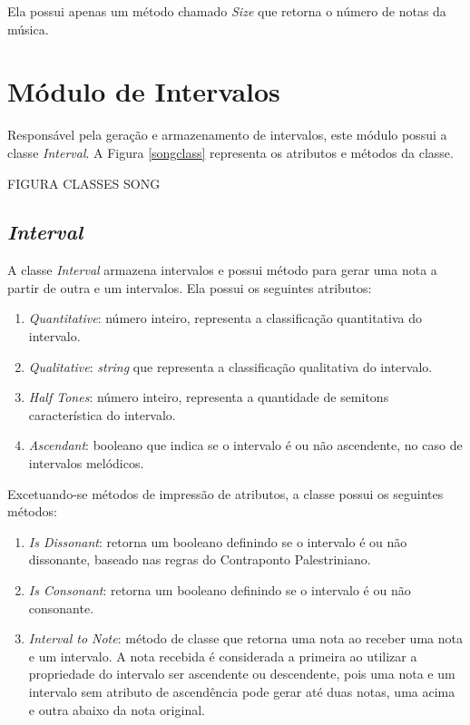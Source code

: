       Ela possui apenas um método chamado \textit{Size} que retorna o número de notas da música.


  \section[Módulo de Intervalos]{Módulo de Intervalos}

    Responsável pela geração e armazenamento de intervalos, este módulo possui a classe \textit{Interval}. A Figura \ref{songclass} representa os atributos e métodos da classe.

    FIGURA CLASSES SONG

    \subsection[\textit{Interval}]{\textit{Interval}}

      A classe \textit{Interval} armazena intervalos e possui método para gerar uma nota a partir de outra e um intervalos. Ela possui os seguintes atributos:

      \begin{enumerate}
        \item \textit{Quantitative}: número inteiro, representa a classificação quantitativa do intervalo.
        \item \textit{Qualitative}: \textit{string} que representa a classificação qualitativa do intervalo.
        \item \textit{Half Tones}: número inteiro, representa a quantidade de semitons característica do intervalo.
        \item \textit{Ascendant}: booleano que indica se o intervalo é ou não ascendente, no caso de intervalos melódicos.
      \end{enumerate}

      Excetuando-se métodos de impressão de atributos, a classe possui os seguintes métodos:

      \begin{enumerate}
        \item \textit{Is Dissonant}: retorna um booleano definindo se o intervalo é ou não dissonante, baseado nas regras do Contraponto Palestriniano.
        \item \textit{Is Consonant}: retorna um booleano definindo se o intervalo é ou não consonante.
        \item \textit{Interval to Note}: método de classe que retorna uma nota ao receber uma nota e um intervalo. A nota recebida é considerada a primeira ao utilizar a propriedade do intervalo ser ascendente ou descendente, pois uma nota e um intervalo sem atributo de ascendência pode gerar até duas notas, uma acima e outra abaixo da nota original.
      \end{enumerate}

